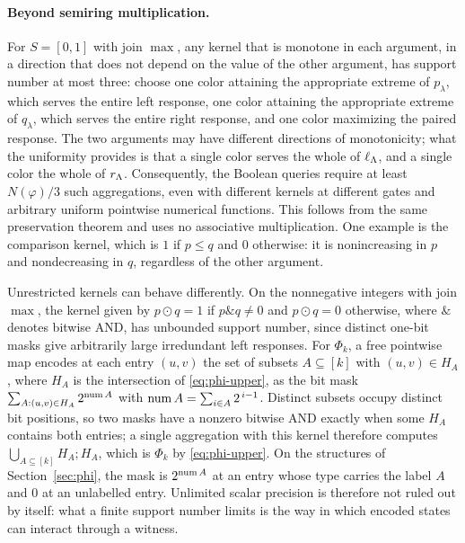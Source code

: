 \paragraph{Beyond semiring multiplication.}
For $S=[0,1]$ with join $\max$, any kernel that is monotone in each
argument, in a direction that does not depend on the value of the other
argument, has support number at most three: choose one color attaining the
appropriate extreme of $p_\lambda$, which serves the entire left response,
one color attaining the appropriate extreme of $q_\lambda$, which serves the
entire right response, and one color maximizing the paired response. The
two arguments may have different directions of monotonicity; what the
uniformity provides is that a single color serves the whole of
$\ell_{\Lambda}$, and a single color the whole of $r_{\Lambda}$. Consequently,
the Boolean queries require at least $N(\varphi)/3$ such aggregations, even
with different kernels at different gates and arbitrary uniform pointwise
numerical functions. This follows from the same preservation theorem and
uses no associative multiplication. One example is the comparison kernel,
which is $1$ if $p\le q$ and $0$ otherwise: it is nonincreasing in $p$ and
nondecreasing in $q$, regardless of the other argument.

Unrestricted kernels can behave differently. On the nonnegative integers
with join $\max$, the kernel given by $p\odot q=1$ if $p\mathbin{\&}q\ne0$
and $p\odot q=0$ otherwise, where $\&$ denotes bitwise AND, has unbounded
support number, since distinct one-bit masks give arbitrarily large
irredundant left responses. For $\Phi_k$, a free pointwise map encodes at
each entry $(u,v)$ the set of subsets $A\subseteq[k]$ with $(u,v)\in H_A$,
where $H_A$ is the intersection of \eqref{eq:phi-upper}, as the bit mask
$\sum_{A:(u,v)\in H_A}2^{\operatorname{num} A}$ with $\operatorname{num} A=\sum_{i\in A}2^{\,i-1}$.
Distinct subsets occupy distinct bit positions, so two masks have a nonzero
bitwise AND exactly when some $H_A$ contains both entries; a single
aggregation with this kernel therefore computes
$\bigcup_{A\subseteq[k]}H_A;H_A$, which is $\Phi_k$ by
\eqref{eq:phi-upper}. On the structures of Section~\ref{sec:phi}, the mask
is $2^{\operatorname{num} A}$ at an entry whose type carries the label $A$ and $0$ at an
unlabelled entry. Unlimited scalar precision is therefore not ruled out by
itself: what a finite support number limits is the way in which encoded
states can interact through a witness.
